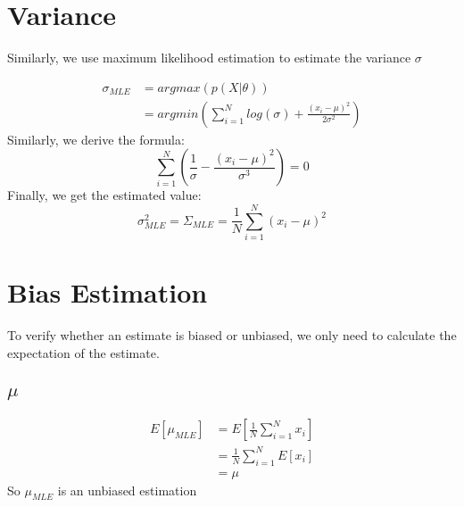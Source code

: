 \documentclass{report}
\begin{document}
\section{Variance}
Similarly, we use maximum likelihood estimation to estimate the variance 
$\sigma $

$$
\begin{aligned}
\sigma_{MLE}
&=argmax(p(X|\theta))\\
&=argmin(\sum_{i=1}^N log(\sigma)+\frac{(x_i-\mu)^2}{2\sigma^2})
\end{aligned}
$$
Similarly, we derive the formula:
$$
\sum_{i=1}^N(\frac{1}{\sigma}-\frac{(x_i-\mu)^2}{\sigma^3})=0
$$
Finally, we get the estimated value:
$$
\sigma_{MLE}^2 = \Sigma_{MLE} = \frac{1}{N} \sum_{i=1}^N (x_i-\mu)^2
$$
\section{Bias Estimation}
To verify whether an estimate is biased or unbiased, we only need to calculate the expectation of the estimate.
\subsection{$\mu$}
$$
\begin{aligned}
E[\mu_{MLE}]
&=E[\frac{1}{N}\sum_{i=1}^N x_i]\\
&=\frac{1}{N}\sum_{i=1}^N E[x_i]\\
&=\mu
\end{aligned}
$$
So $\mu_{MLE}$ is an unbiased estimation
\end{document}
